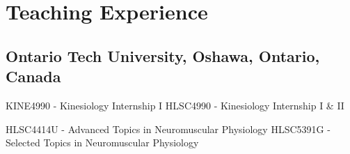 \documentclass[11pt,a4paper,sans]{moderncv} %
\newcommand\Colorhref[3][orange]{\href{#2}{\small\color{#1}#3}}
\begin{document}










\section{Teaching Experience}
\subsection{Ontario Tech University, Oshawa, Ontario, Canada}
{KINE4990 - Kinesiology Internship I
}
{HLSC4990 - Kinesiology Internship I \& II}

{HLSC4414U - Advanced Topics in Neuromuscular Physiology
}
\cventry{}{}{}{}
{HLSC5391G - Selected Topics in Neuromuscular Physiology
}


\end{document}
